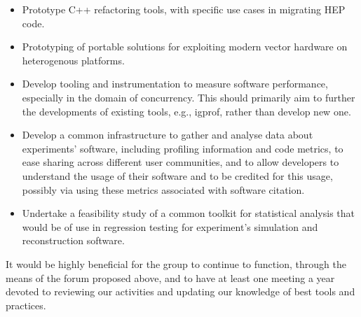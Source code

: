 \documentclass[12pt,a4paper]{article}
\begin{document}
\begin{itemize}
\item
    Prototype C++ refactoring tools, with specific use cases in migrating
  HEP code.
  \item
    Prototyping of portable solutions for exploiting modern vector
  hardware on heterogenous platforms.
  \item
    Develop tooling and instrumentation to measure software performance,
  especially in the domain of concurrency. This should primarily aim to
  further the developments of existing tools, e.g., igprof, rather than
  develop new one.
  \item
    Develop a common infrastructure to gather and analyse data about
  experiments' software, including profiling information and code
  metrics, to ease sharing across different user communities, and to
  allow developers to understand the usage of their software and to be
  credited for this usage, possibly via using these metrics associated
  with software citation.
  \item
    Undertake a feasibility study of a common toolkit for statistical
  analysis that would be of use in regression testing for experiment's
  simulation and reconstruction software.
  \end{itemize}

It would be highly beneficial for the group to continue to function,
through the means of the forum proposed above, and to have at least one
meeting a year devoted to reviewing our activities and updating our
knowledge of best tools and practices.
\end{document}
